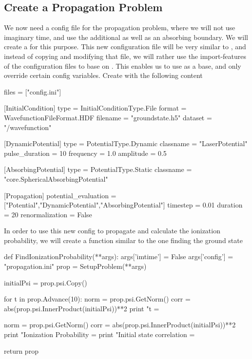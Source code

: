 \subsection{Create a Propagation Problem}
We now need a config file for the propagation problem, where we will not use imaginary time, and use the additional  as well as an absorbing boundary. We will create a  for this purpose. This new configuration file will be very similar to , and instead of copying and modifying that file, we will rather use the import-features of the configuration files to base  on . This enables
us to use  as a base, and only override certain config  variables. Create  with the following content
\begin{python}
[Import]
files = ["config.ini"]

[InitialCondition]
type = InitialConditionType.File
format = WavefunctionFileFormat.HDF
filename = "groundstate.h5"
dataset = "/wavefunction"

[DynamicPotential]
type = PotentialType.Dynamic
classname = "LaserPotential"
pulse_duration = 10
frequency = 1.0
amplitude = 0.5

[AbsorbingPotential]
type = PotentialType.Static
classname = "core.SphericalAbsorbingPotential"

[Propagation]
potential_evaluation = ["Potential","DynamicPotential","AbsorbingPotential"]
timestep = 0.01
duration = 20
renormalization = False
\end{python}
In order to use this new config to propagate and calculate the ionization probability, we will create a function similar to the one finding the ground state
\begin{python}
def FindIonizationProbability(**args):
	args['imtime'] = False
	args['config'] = "propagation.ini"
	prop = SetupProblem(**args)

	initialPsi = prop.psi.Copy()

	for t in prop.Advance(10):
		norm = prop.psi.GetNorm()
		corr = abs(prop.psi.InnerProduct(initialPsi))**2
		print "t = %

	norm = prop.psi.GetNorm()
	corr = abs(prop.psi.InnerProduct(initialPsi))**2
	print "Ionization Probability = %
	print "Initial state correlation = %

	return prop	
\end{python}
